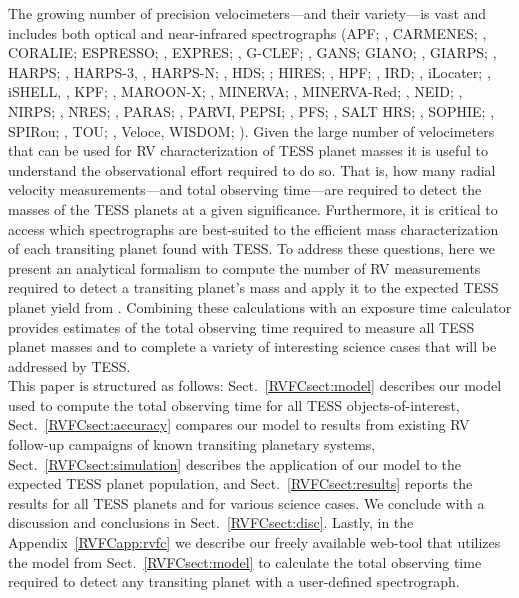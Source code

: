 The growing number of precision velocimeters---and their variety---is vast and includes both optical
and near-infrared spectrographs 
(APF; \citealt{vogt14},
CARMENES; \citealt{quirrenbach14},
CORALIE;
ESPRESSO; \citealt{pepe10},
EXPRES; \citealt{jurgenson16},
G-CLEF; \citealt{szentgyorgyi16},
GANS;
GIANO; \citealt{oliva06},
GIARPS; \citealt{claudi16},
HARPS; \citealt{mayor03},
HARPS-3, \citealt{thompson16},
HARPS-N; \citealt{costentino12},
HDS; \citealt{noguchi98};
HIRES; \citealt{vogt94},
HPF; \citealt{mahadevan12},
IRD; \citealt{kotani14},
iLocater; \citealt{crepp16},
iSHELL, \citealt{rayner12},
KPF; \citealt{gibson16},
MAROON-X; \citealt{seifahrt18},
MINERVA; \citealt{swift15},
MINERVA-Red; \citealt{sliski17},
NEID; \citealt{allen18},
NIRPS; \citealt{bouchy17},
NRES; \citealt{siverd16},
PARAS; \citealt{chakraborty08},
PARVI,
PEPSI; \citealt{strassmeier15},
PFS; \citealt{crane10},
SALT HRS; \citealt{crause14},
SOPHIE; \citealt{perruchot11},
SPIRou; \citealt{artigau14},
TOU; \citealt{ge16},
Veloce,
WISDOM; \citealt{fzresz16}).
Given the large number of velocimeters that can be used for RV characterization of TESS
planet masses it is useful to understand the observational effort required to do so. That is, how many radial
velocity measurements---and total observing time---are required to detect the masses of the TESS 
planets at a given significance. Furthermore,
it is critical to access which spectrographs are best-suited to the efficient mass characterization of
each transiting planet found with TESS. To address these questions, here we present an analytical formalism
to compute the number of RV measurements required to detect a transiting planet's mass and apply it to the
expected TESS planet yield from .
Combining these calculations with an exposure time calculator provides estimates of the total
observing time required to measure all TESS planet masses and to complete a variety of interesting science
cases that will be addressed by TESS. \\

This paper is structured as follows: Sect.~\ref{RVFCsect:model} describes our model used to compute the
total observing time for all TESS objects-of-interest, Sect.~\ref{RVFCsect:accuracy} compares our model to
results from existing RV follow-up campaigns of known transiting planetary systems,
Sect.~\ref{RVFCsect:simulation} describes the application of our model to the expected
TESS planet population, and Sect.~\ref{RVFCsect:results} reports the results for all TESS planets and for
various science cases. We conclude with a discussion and conclusions in Sect.~\ref{RVFCsect:disc}. 
Lastly, in the Appendix~\ref{RVFCapp:rvfc}
we describe our freely available web-tool that utilizes the model from Sect.~\ref{RVFCsect:model}
to calculate the total observing time required to detect any transiting planet with a
user-defined spectrograph.


